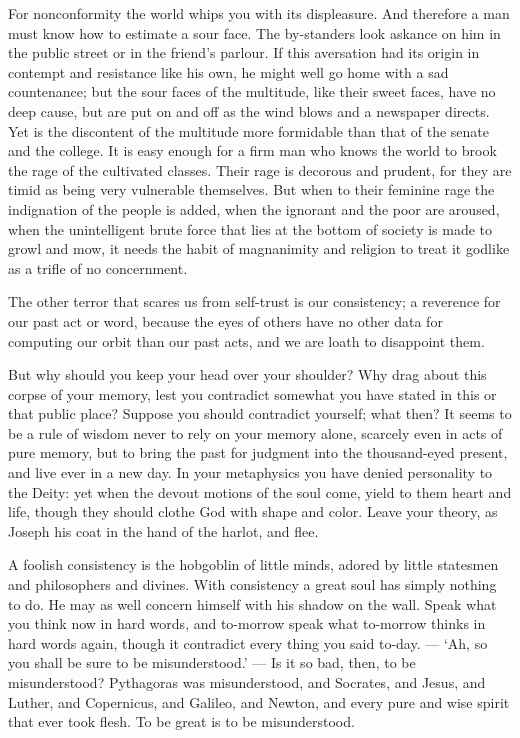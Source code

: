 \documentclass[12pt]{article}
\begin{document}
For nonconformity the world whips you with its displeasure. And therefore a
man must know how to estimate a sour face. The by-standers look askance on
him in the public street or in the friend's parlour. If this aversation had
its origin in contempt and resistance like his own, he might well go home
with a sad countenance; but the sour faces of the multitude, like their
sweet faces, have no deep cause, but are put on and off as the wind blows
and a newspaper directs. Yet is the discontent of the multitude more
formidable than that of the senate and the college. It is easy enough for a
firm man who knows the world to brook the rage of the cultivated classes.
Their rage is decorous and prudent, for they are timid as being very
vulnerable themselves. But when to their feminine rage the indignation of
the people is added, when the ignorant and the poor are aroused, when the
unintelligent brute force that lies at the bottom of society is made to
growl and mow, it needs the habit of magnanimity and religion to treat it
godlike as a trifle of no concernment.

The other terror that scares us from self-trust is our consistency; a
reverence for our past act or word, because the eyes of others have no other
data for computing our orbit than our past acts, and we are loath to
disappoint them.

But why should you keep your head over your shoulder? Why drag about this
corpse of your memory, lest you contradict somewhat you have stated in this
or that public place? Suppose you should contradict yourself; what then? It
seems to be a rule of wisdom never to rely on your memory alone, scarcely
even in acts of pure memory, but to bring the past for judgment into the
thousand-eyed present, and live ever in a new day. In your metaphysics you
have denied personality to the Deity: yet when the devout motions of the
soul come, yield to them heart and life, though they should clothe God with
shape and color. Leave your theory, as Joseph his coat in the hand of the
harlot, and flee.

A foolish consistency is the hobgoblin of little minds, adored by little
statesmen and philosophers and divines. With consistency a great soul has
simply nothing to do. He may as well concern himself with his shadow on the
wall. Speak what you think now in hard words, and to-morrow speak what
to-morrow thinks in hard words again, though it contradict every thing you
said to-day. --- `Ah, so you shall be sure to be misunderstood.' --- Is it so
bad, then, to be misunderstood? Pythagoras was misunderstood, and Socrates,
and Jesus, and Luther, and Copernicus, and Galileo, and Newton, and every
pure and wise spirit that ever took flesh. To be great is to be
misunderstood.
\end{document}
